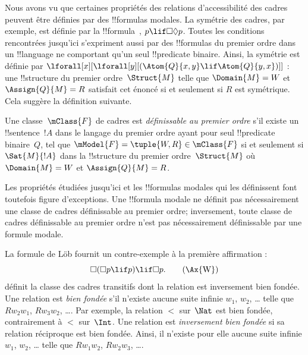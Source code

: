 \documentclass[../../../include/open-logic-section]{subfiles}
\begin{document}


Nous avons vu que certaines propriétés des relations
d'accessibilité des cadres peuvent être définies par des
!!{formula}s modales. La symétrie des cadres, par exemple, est
définie par la !!{formula}~,
$p \lif \Box\Diamond p$. Toutes les conditions rencontrées
jusqu'ici s'expriment aussi par des !!{formula}s du premier
ordre dans un !!{language} ne comportant qu'un seul
!!{predicate} binaire. Ainsi, la symétrie est définie par
$\lforall[x][\lforall[y][(\Atom{Q}{x,y} \lif \Atom{Q}{y, x})]]$ :
une !!{structure} du premier ordre~$\Struct{M}$ telle que
$\Domain{M} = W$ et $\Assign{Q}{M} = R$ satisfait cet
énoncé si et seulement si $R$ est symétrique. Cela suggère
la définition suivante.

\begin{defn}
  Une classe~$\mClass{F}$ de cadres est
  \emph{définissable au premier ordre} s'il existe un
  !!{sentence}~$!A$ dans le langage du premier ordre ayant
  pour seul !!{predicate} binaire~$Q$, tel que
  $\mModel{F} = \tuple{W, R} \in \mClass{F}$ si et seulement si
  $\Sat{M}{!A}$ dans la !!{structure} du premier
  ordre~$\Struct{M}$ où $\Domain{M} = W$ et
  $\Assign{Q}{M} = R$.
\end{defn}

Les propriétés étudiées jusqu'ici et les !!{formula}s modales
qui les définissent font toutefois figure d'exceptions. Une
!!{formula} modale ne définit pas nécessairement une classe
de cadres définissable au premier ordre; inversement, toute
classe de cadres définissable au premier ordre n'est pas
nécessairement définissable par une formule modale.

La formule de Löb fournit un contre-exemple à la première
affirmation :
\begin{equation}
\Box(\Box p \lif p) \lif \Box p. \tag{\Ax{W}}
\end{equation}
 définit la classe des cadres transitifs dont la relation
est inversement bien fondée. Une relation est \emph{bien fondée}
s'il n'existe aucune suite infinie $w_1$, $w_2$, \dots{} telle que
$Rw_2w_1$, $Rw_3w_2$, \dots. Par exemple, la relation $<$
sur~$\Nat$ est bien fondée, contrairement à $<$ sur~$\Int$.
Une relation est \emph{inversement bien fondée} si sa relation
réciproque est bien fondée. Ainsi, il n'existe pour elle
aucune suite infinie $w_1$, $w_2$, \dots{} telle que
$Rw_1w_2$, $Rw_2w_3$, \dots.
\end{document}
